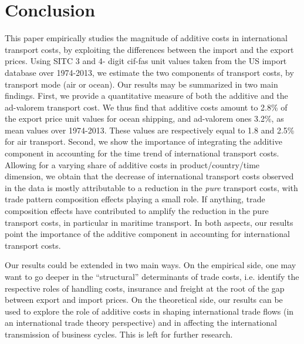 \documentclass[a4paper,11pt]{article}
\begin{document}
\section{Conclusion \label{sec:conclu}}

This paper empirically studies the magnitude of additive costs in international transport costs, by exploiting the differences between the import and the export prices. Using SITC 3 and 4- digit cif-fas unit values taken from the US import database over 1974-2013, we estimate the two components of transport costs, by transport mode (air or ocean). Our results may be summarized in two main findings. First, we provide a quantitative measure of both the additive and the ad-valorem transport cost. We thus find that additive costs amount to 2.8\% of the export price unit values for ocean shipping, and ad-valorem ones 3.2\%, as mean values over 1974-2013. These values are respectively equal to 1.8 and 2.5\% for air transport. Second, we show the importance of integrating the additive component in accounting for the time trend of international transport costs. Allowing for a varying share of additive costs in product/country/time dimension, we obtain that the decrease of international transport costs observed in the data is mostly attributable to a reduction in the \textit{pure} transport costs, with trade pattern composition effects playing a small role. If anything, trade composition effects have contributed to amplify the reduction in the pure transport costs, in particular in maritime transport. In both aspects, our results point the importance of the additive component in accounting for international transport costs.

Our results could be extended in two main ways. On the empirical side, one may want to go deeper in the ``structural'' determinants of trade costs, i.e. identify the respective roles of handling costs, insurance and freight at the root of the gap between export and import prices. On the theoretical side, our results can be used to explore the role of additive costs in shaping international trade flows (in an international trade theory perspective) and in affecting the international transmission of business cycles. This is left for further research.



\newpage




\newpage


\appendix

\clearpage
\end{document}
